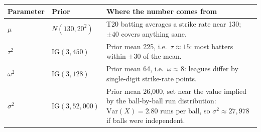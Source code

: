 \begin{tabular}{llp{8.2cm}}
\toprule
Parameter & Prior & Where the number comes from \\
\midrule
$\mu$ & $N(130, 20^2)$ & T20 batting averages a strike rate near 130; $\pm40$ covers anything sane. \\[2pt]
$\tau^2$ & $\mathrm{IG}(3, 450)$ & Prior mean 225, i.e.\ $\tau\approx15$: most batters within $\pm30$ of the mean. \\[2pt]
$\omega^2$ & $\mathrm{IG}(3, 128)$ & Prior mean 64, i.e.\ $\omega\approx8$: leagues differ by single-digit strike-rate points. \\[2pt]
$\sigma^2$ & $\mathrm{IG}(3, 52,000)$ & Prior mean 26,000, set near the value implied by the ball-by-ball run distribution: $\mathrm{Var}(X)=2.80$ runs per ball, so $\sigma^2\approx27,978$ if balls were independent. \\[2pt]
\bottomrule
\end{tabular}